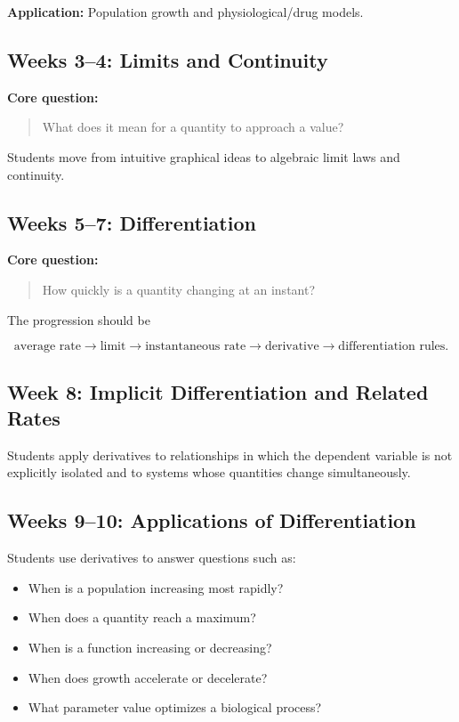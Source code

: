 \documentclass[11pt]{article}
\begin{document}
\textbf{Application:}
Population growth and physiological/drug models.

\subsection*{Weeks 3--4: Limits and Continuity}

\textbf{Core question:}

\begin{quote}
What does it mean for a quantity to approach a value?
\end{quote}

Students move from intuitive graphical ideas to algebraic limit laws and
continuity.

\subsection*{Weeks 5--7: Differentiation}

\textbf{Core question:}

\begin{quote}
How quickly is a quantity changing at an instant?
\end{quote}

The progression should be

\[
\text{average rate}
\rightarrow
\text{limit}
\rightarrow
\text{instantaneous rate}
\rightarrow
\text{derivative}
\rightarrow
\text{differentiation rules}.
\]

\subsection*{Week 8: Implicit Differentiation and Related Rates}

Students apply derivatives to relationships in which the dependent variable
is not explicitly isolated and to systems whose quantities change
simultaneously.

\subsection*{Weeks 9--10: Applications of Differentiation}

Students use derivatives to answer questions such as:

\begin{itemize}
    \item When is a population increasing most rapidly?
    \item When does a quantity reach a maximum?
    \item When is a function increasing or decreasing?
    \item When does growth accelerate or decelerate?
    \item What parameter value optimizes a biological process?
\end{itemize}
\end{document}
